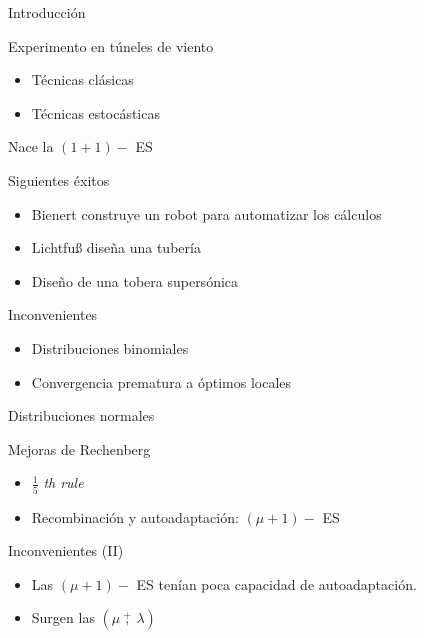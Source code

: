 \documentclass[10pt]{beamer}
\begin{document}
\begin{frame}{Introducción}
  \begin{center}
    Experimento en túneles de viento
  \end{center}

  \begin{itemize}
  \item Técnicas clásicas
  \item Técnicas estocásticas
  \end{itemize}

  \begin{center}
    Nace la $(1 + 1) -$ ES
  \end{center}
\end{frame}

\begin{frame}{Siguientes éxitos}
  \begin{itemize}
  \item Bienert construye un robot para automatizar los cálculos
  \item Lichtfu{\ss} diseña una tubería
  \item Diseño de una tobera supersónica
  \end{itemize}
\end{frame}

\begin{frame}{Inconvenientes}
  \begin{itemize}
  \item Distribuciones binomiales
  \item Convergencia prematura a óptimos locales
  \end{itemize}

  \begin{center}
    Distribuciones normales
  \end{center}
\end{frame}

\begin{frame}{Mejoras de Rechenberg}
  \begin{itemize}
  \item $\frac{1}{5}$ \emph{th rule}
  \item Recombinación y autoadaptación: $(\mu + 1) -$ ES
  \end{itemize}
\end{frame}

\begin{frame}{Inconvenientes (II)}
  \begin{itemize}[<+- | alert@+>]
  \item Las $(\mu + 1) -$ ES tenían poca capacidad de autoadaptación.
  \item Surgen las $\left( \mu \ \overset{+}{,} \ \lambda \right)$
  \end{itemize}
\end{frame}
\end{document}
